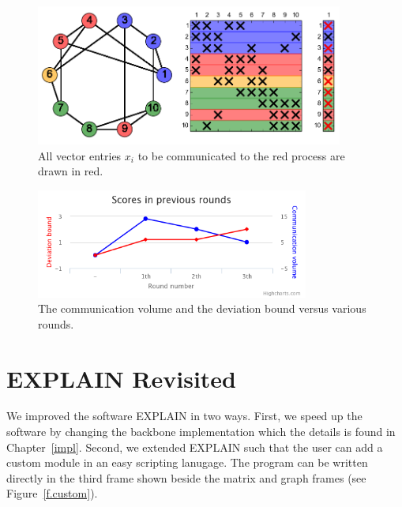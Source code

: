 \documentclass[12pt, oneside]{book}
\begin{document}
\begin{figure}
\centering
\includegraphics[width=0.9\textwidth]{redComm}
\caption{All vector entries $x_i$ to be communicated to the red process are drawn in red.}
\label{f.communication}
\end{figure}

\begin{figure}
\centering
\includegraphics[width=0.8\textwidth]{chart}
\caption{The communication volume and the deviation bound versus various rounds.}
\label{f.score}
\end{figure}

\section{EXPLAIN Revisited}
We improved the software EXPLAIN in two ways. 
First, we speed up the software by changing the backbone implementation
which the details is found in Chapter~\ref{impl}.
Second, we extended EXPLAIN such that the user can add a custom module 
in an easy scripting lanugage. The program can be written directly 
in the third frame shown beside the matrix and graph frames
(see Figure~\ref{f.custom}).
\end{document}
